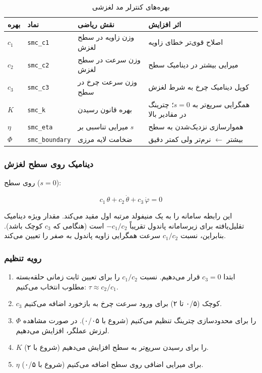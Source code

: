 \begin{table}[H]
\centering
\caption{بهره‌های کنترلر مد لغزشی}
\label{tab:smc-gains}
\begin{tabular}{@{}llll@{}}
\toprule
بهره & نماد & نقش ریاضی & اثر افزایش \\
\midrule
$c_1$ & \texttt{smc\_c1} & وزن زاویه در سطح لغزش & اصلاح قوی‌تر خطای زاویه \\
$c_2$ & \texttt{smc\_c2} & وزن سرعت در سطح لغزش & میرایی بیشتر در دینامیک سطح \\
$c_3$ & \texttt{smc\_c3} & وزن سرعت چرخ در سطح & کوپل دینامیک چرخ به شرط لغزش \\
$K$ & \texttt{smc\_k} & بهره قانون رسیدن & همگرایی سریع‌تر به $s=0$؛ چترینگ در مقادیر بالا \\
$\eta$ & \texttt{smc\_eta} & میرایی تناسبی بر $s$ & هموارسازی نزدیک‌شدن به سطح \\
$\Phi$ & \texttt{smc\_boundary} & ضخامت لایه مرزی & بیشتر $\leftarrow$ نرم‌تر ولی کمتر دقیق \\
\bottomrule
\end{tabular}
\end{table}

\subsubsection{دینامیک روی سطح لغزش}

روی سطح ($s = 0$):

\begin{equation}
c_1\,\theta + c_2\,\dot\theta + c_3\,\dot\varphi = 0
\end{equation}

این رابطه سامانه را به یک منیفولد مرتبه اول مقید می‌کند. مقدار ویژه دینامیک تقلیل‌یافته برای زیرسامانه پاندول تقریباً $-c_1/c_2$ است (هنگامی که $c_3$ کوچک باشد). بنابراین، نسبت $c_1/c_2$ سرعت همگرایی زاویه پاندول به صفر را تعیین می‌کند.

\subsubsection{رویه تنظیم}

\begin{enumerate}[label=\arabic*.]
    \item ابتدا $c_3 = 0$ قرار می‌دهیم. نسبت $c_1/c_2$ را برای تعیین ثابت زمانی حلقه‌بسته مطلوب انتخاب می‌کنیم: $\tau \approx c_2/c_1$.
    \item $c_3$ کوچک (۰/۵ تا ۲) برای ورود سرعت چرخ به بازخورد اضافه می‌کنیم.
    \item $\Phi$ را برای محدودسازی چترینگ تنظیم می‌کنیم (شروع با ۰/۰۵). در صورت مشاهده لرزش عملگر، افزایش می‌دهیم.
    \item $K$ را برای رسیدن سریع‌تر به سطح افزایش می‌دهیم (شروع با ۲).
    \item $\eta$ (شروع با ۰/۵) برای میرایی اضافی روی سطح اضافه می‌کنیم.
\end{enumerate}


